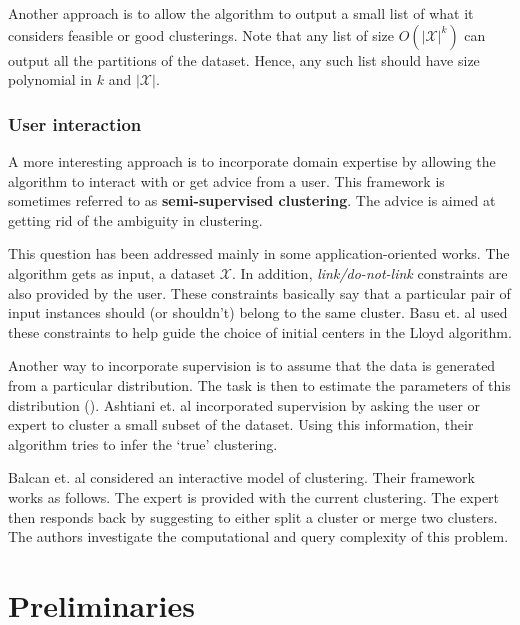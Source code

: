 \documentclass[letterpaper,12pt,titlepage,oneside,final]{book}
\newcommand{\mc}{\mathcal}
\begin{document}
Another approach is to allow the algorithm to output a small list of what it considers feasible or good clusterings. Note that any list of size $O(|\mc X|^k)$ can output all the partitions of the dataset. Hence, any such list should have size polynomial in $k$ and $|\mc X|$.
   
\subsection{User interaction}
A more interesting approach is to incorporate domain expertise by allowing the algorithm to interact with or get advice from a user. This framework is sometimes referred to as \textbf{semi-supervised clustering}. The advice is aimed at getting rid of the ambiguity in clustering. 

This question has been addressed mainly in some application-oriented works. The algorithm gets as input, a dataset $\mc X$. In addition, \textit{link/do-not-link} constraints are also provided by the user. These constraints basically say that a particular pair of input instances should (or shouldn't) belong to the same cluster. Basu et. al \cite{basu2002semi} used these constraints to help guide the choice of initial centers in the Lloyd algorithm. 

Another way to incorporate supervision is to assume that the data is generated from a particular distribution. The task is then to estimate the parameters of this distribution (\cite{basu2004probabilistic, kulis2009semi}). Ashtiani et. al \cite{ashtiani2015representation} incorporated supervision by asking the user or expert to cluster a small subset of the dataset. Using this information, their algorithm tries to infer the `true' clustering. 

Balcan et. al \cite{balcan2008clustering} considered an interactive model of clustering. Their framework works as follows. The expert is provided with the current clustering. The expert then responds back by suggesting to either split a cluster or merge two clusters. The authors investigate the computational and query complexity of this problem. 









\chapter{Preliminaries}
\label{METHOD}
\end{document}
